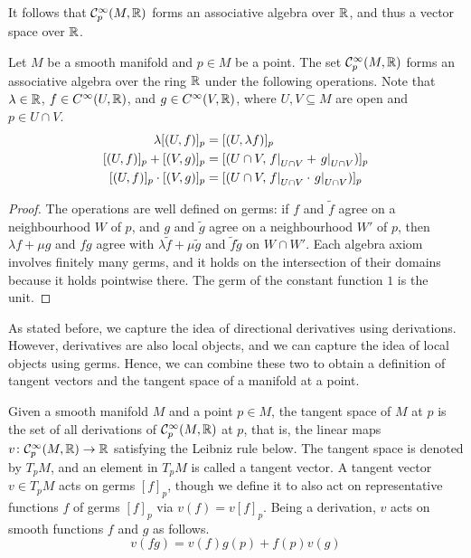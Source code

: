 \documentclass[a4paper,12pt]{article}
\begin{document}
It follows that $\mathcal{C}^\infty_p(M, \mathbb{R})$ forms an associative algebra over $\mathbb{R}$, and thus a vector space over $\mathbb{R}$.
\begin{proposition}\label{prop:germs_form_associative_algebra}
    Let $M$ be a smooth manifold and $p \in M$ be a point.
    The set $\mathcal{C}^\infty_p (M, \mathbb{R})$ forms an associative algebra over the ring $\mathbb{R}$ under the following operations.
    Note that $\lambda \in \mathbb{R}$, $f \in C^\infty(U, \mathbb{R})$, and $g \in C^\infty(V, \mathbb{R})$, where $U, V \subseteq M$ are open and $p \in U \cap V$.
    \begin{align}
        \begin{split}
        \lambda [(U, f)]_p &= [(U, \lambda f)]_p \\
        [(U, f)]_p + [(V, g)]_p &= [(U \cap V, \eval{f}{U \cap V} + \eval{g}{U \cap V})]_p \\
        [(U, f)]_p \cdot [(V, g)]_p &= [(U \cap V, \eval{f}{U \cap V} \cdot \eval{g}{U \cap V})]_p
        \end{split}
    \end{align}
\end{proposition}
\begin{proof}
    The operations are well defined on germs: if $f$ and $\tilde{f}$ agree on a neighbourhood $W$ of $p$, and $g$ and $\tilde{g}$ agree on a neighbourhood $W'$ of $p$, then $\lambda f + \mu g$ and $fg$ agree with $\lambda \tilde{f} + \mu \tilde{g}$ and $\tilde{f}\tilde{g}$ on $W \cap W'$.
    Each algebra axiom involves finitely many germs, and it holds on the intersection of their domains because it holds pointwise there.
    The germ of the constant function $1$ is the unit.
\end{proof}
As stated before, we capture the idea of directional derivatives using derivations.
However, derivatives are also local objects, and we can capture the idea of local objects using germs.
Hence, we can combine these two to obtain a definition of tangent vectors and the tangent space of a manifold at a point.
\begin{definition}\label{def:tangent_space}
    Given a smooth manifold $M$ and a point $p \in M$, the tangent space of $M$ at $p$ is the set of all derivations of $\mathcal{C}^\infty_p(M, \mathbb{R})$ at $p$, that is, the linear maps $v \colon \mathcal{C}^\infty_p(M, \mathbb{R}) \to \mathbb{R}$ satisfying the Leibniz rule below.
    The tangent space is denoted by $T_p M$, and an element in $T_p M$ is called a tangent vector.
    A tangent vector $v \in T_p M$ acts on germs $[f]_p$, though we define it to also act on representative functions $f$ of germs $[f]_p$ via $v(f) = v[f]_p$.
    Being a derivation, $v$ acts on smooth functions $f$ and $g$ as follows.
    \begin{equation}
        v(fg) = v(f)g(p) + f(p)v(g)
    \end{equation}
\end{definition}
\end{document}
